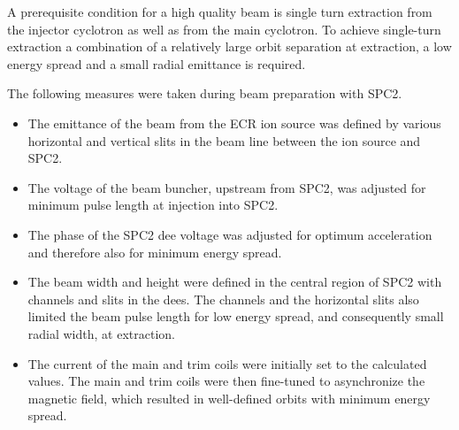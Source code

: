 \documentclass[11pt]{report}
\begin{document}
A prerequisite condition for a high quality beam is single turn extraction from the injector cyclotron
as well as from the main cyclotron.
To achieve single-turn extraction a combination of a relatively large orbit separation 
at extraction, a low energy spread and a small radial emittance is required.
%

The following measures were taken during beam preparation with SPC2.
\begin{itemize}
\item The emittance of the beam from the ECR ion source was
      defined by various horizontal and vertical slits in the beam line 
      between the ion source and SPC2.
\item The voltage of the beam buncher, upstream from SPC2, was adjusted for
      minimum pulse length at injection into SPC2.
\item The phase of the SPC2 dee voltage was adjusted for optimum acceleration 
      and therefore also for minimum energy spread.
\item The beam width and height were defined in the central region of 
      SPC2 with channels and slits in the dees.  %
      The channels and the horizontal slits also limited the beam pulse 
      length for low energy spread, and consequently small radial width, at extraction.
\item The current of the main and trim coils were initially set to the calculated values. 
      The main and trim coils were then fine-tuned to asynchronize the magnetic field, 
      which resulted in well-defined orbits with minimum energy spread. 
\end{itemize}
\end{document}
